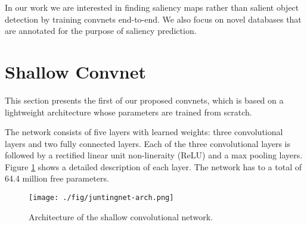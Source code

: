 \documentclass[10pt,twocolumn,letterpaper]{article}
\begin{document}
In our work we are interested in finding saliency maps rather than salient object detection by training convnets end-to-end. We also focus on novel databases that are annotated for the purpose of saliency prediction.

\section{Shallow Convnet}\label{sec:JuntingNet}%
This section presents the first of our proposed convnets, which is based on a lightweight architecture whose parameters are trained from scratch.


The network consists of five layers with learned weights: three convolutional layers and two fully connected layers.
Each of the three convolutional layers is followed by a rectified linear unit non-lineraity (ReLU) and a max pooling layers.
Figure \ref{fig:juntingnet} shows a detailed description of each layer. The network has to a total of 64.4 million free parameters. 

\begin{figure}
  \centering
  \texttt{[image: ./fig/juntingnet-arch.png]}
  \caption{Architecture of the shallow convolutional network.}
  \label{fig:juntingnet}
\end{figure}%
\end{document}
